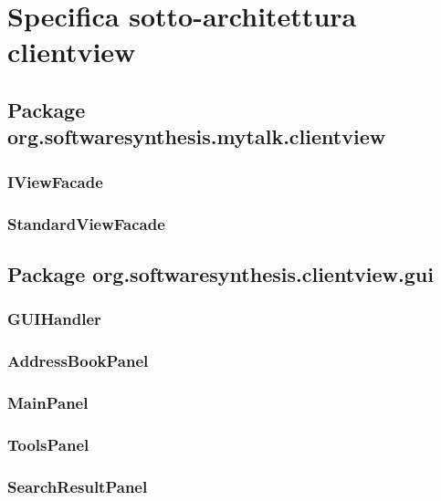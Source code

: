\clearpage

\section{Specifica sotto-architettura clientview}\label{sec:clientviewarchitecture}

\subsection{Package org.softwaresynthesis.mytalk.clientview}\label{sec:clientview}

\subsubsection{IViewFacade}\label{sec:iviewfacade}

\subsubsection{StandardViewFacade}\label{sec:standardviewfacade}

\subsection{Package org.softwaresynthesis.clientview.gui}\label{sec:gui}

\subsubsection{GUIHandler}\label{sec:guihandler}

\subsubsection{AddressBookPanel}\label{sec:addressbookpanel}

\subsubsection{MainPanel}\label{sec:mainpanel}

\subsubsection{ToolsPanel}\label{sec:toolspanel}

\subsubsection{SearchResultPanel}\label{sec:searchresultpanel}

